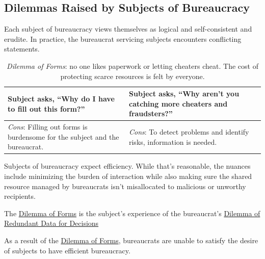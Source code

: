 \subsection*{Dilemmas Raised by Subjects of Bureaucracy\label{sec:subjects-dilemmas}}


Each subject of bureaucracy views themselves as logical and self-consistent and erudite. In practice, the bureaucrat servicing subjects encounters conflicting statements. 

\begin{center}
\begin{table}[H] %
\begin{tabular}{ | m{\dilemmatablewidth}| m{\dilemmatablewidth} | } 
  \hline
  \textbf{Subject asks, ``Why do I have to fill out this form?''} &
  \textbf{Subject asks, ``Why aren't you catching more cheaters and fraudsters?''} \\
  \hline
  \textit{Cons}: Filling out forms is burdensome for the subject and the bureaucrat. & 
  \textit{Cons}: To detect problems and identify risks, information is needed. \\
  \hline
\end{tabular}
\caption{\textit{Dilemma of Forms}: no one likes paperwork or letting cheaters cheat. The cost of protecting scarce resources is felt by everyone.
}
\label{table:dilemma-subject-forms}
\end{table}
\end{center}

Subjects of bureaucracy expect efficiency. While that's reasonable, the nuances include minimizing the burden of interaction while also making sure the shared resource managed by bureaucrats isn't misallocated to malicious or unworthy recipients. 

The 
\hyperref[table:dilemma-subject-forms]{Dilemma of Forms}
is the subject's experience of the bureaucrat's 
\hyperref[table:dilemma-personal-single-bit-decision]{Dilemma of Redundant Data for Decisions}

%
As a result of the \hyperref[table:dilemma-subject-forms]{Dilemma of Forms}, bureaucrats are unable to satisfy the desire of subjects to have efficient bureaucracy. 

